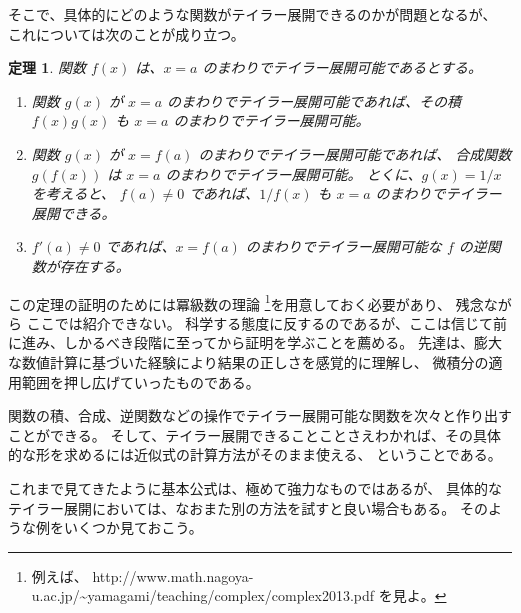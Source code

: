 \documentclass[a4paper]{jsarticle}
\newtheorem{Theorem}{定理}[section]
\theoremstyle{definition}
\theoremstyle{remark}
\begin{document}
そこで、具体的にどのような関数がテイラー展開できるのかが問題となるが、
これについては次のことが成り立つ。


\begin{Theorem}
関数 $f(x)$ は、$x=a$ のまわりでテイラー展開可能であるとする。
  \begin{enumerate}
\item
関数 $g(x)$ が $x=a$ のまわりでテイラー展開可能であれば、その積 $f(x)g(x)$ も
$x=a$ のまわりでテイラー展開可能。
\item 
関数 $g(x)$ が $x= f(a)$ のまわりでテイラー展開可能であれば、
合成関数 $g(f(x))$ は $x=a$ のまわりでテイラー展開可能。
とくに、$g(x) = 1/x$ を考えると、
$f(a) \not= 0$ であれば、$1/f(x)$ も $x=a$ のまわりでテイラー展開できる。
\item 
$f'(a) \not= 0$ であれば、$x=f(a)$ のまわりでテイラー展開可能な $f$ の逆関数が存在する。
\end{enumerate}
\end{Theorem}

この定理の証明のためには冪級数の理論
\footnote{
例えば、
http://www.math.nagoya-u.ac.jp/\~{}yamagami/teaching/complex/complex2013.pdf
を見よ。
}を用意しておく必要があり、
残念ながら ここでは紹介できない。
科学する態度に反するのであるが、ここは信じて前に進み、しかるべき段階に至ってから証明を学ぶことを薦める。
先達は、膨大な数値計算に基づいた経験により結果の正しさを感覚的に理解し、
微積分の適用範囲を押し広げていったものである。


関数の積、合成、逆関数などの操作でテイラー展開可能な関数を次々と作り出すことができる。
そして、テイラー展開できることことさえわかれば、その具体的な形を求めるには近似式の計算方法がそのまま使える、
ということである。

\bigskip
これまで見てきたように基本公式は、極めて強力なものではあるが、
具体的なテイラー展開においては、なおまた別の方法を試すと良い場合もある。
そのような例をいくつか見ておこう。
\end{document}
